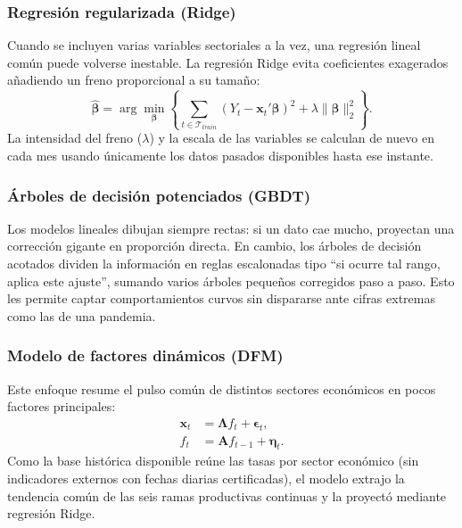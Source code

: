 \subsubsection{Regresión regularizada (Ridge)}

Cuando se incluyen varias variables sectoriales a la vez, una regresión lineal común puede volverse inestable. La regresión Ridge \parencite{hoerl1970} evita coeficientes exagerados añadiendo un freno proporcional a su tamaño:
\begin{equation}
	\widehat{\boldsymbol{\beta}}=
	\arg\min_{\boldsymbol{\beta}}
	\left\{
	\sum_{t\in\mathcal{T}_{train}}(Y_t-\mathbf{x}_t'\boldsymbol{\beta})^2
	+\lambda\|\boldsymbol{\beta}\|_2^2
	\right\}.
	\label{eq:ridge}
\end{equation}
La intensidad del freno (\(\lambda\)) y la escala de las variables se calculan de nuevo en cada mes usando únicamente los datos pasados disponibles hasta ese instante.

\subsubsection{Árboles de decisión potenciados (GBDT)}

Los modelos lineales dibujan siempre rectas: si un dato cae mucho, proyectan una corrección gigante en proporción directa. En cambio, los árboles de decisión acotados \parencite{friedman2001,chen2016} dividen la información en reglas escalonadas tipo ``si ocurre tal rango, aplica este ajuste'', sumando varios árboles pequeños corregidos paso a paso. Esto les permite captar comportamientos curvos sin dispararse ante cifras extremas como las de una pandemia.

\subsubsection{Modelo de factores dinámicos (DFM)}

Este enfoque \parencite{stock2002,giannone2008} resume el pulso común de distintos sectores económicos en pocos factores principales:
\begin{align}
	\mathbf{x}_t&=\boldsymbol{\Lambda}f_t+\boldsymbol{\epsilon}_t,\\
	f_t&=\mathbf{A}f_{t-1}+\boldsymbol{\eta}_t.
\end{align}
Como la base histórica disponible reúne las tasas por sector económico (sin indicadores externos con fechas diarias certificadas), el modelo extrajo la tendencia común de las seis ramas productivas continuas y la proyectó mediante regresión Ridge.

